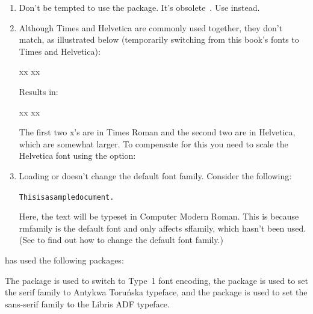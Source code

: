 \begin{enumerate}

\item \warning Don't be tempted to use the  package. It's
obsolete~\cite{l2tabu}. Use  instead.

\item Although Times and Helvetica are commonly used together, they
don't match, as illustrated below (temporarily switching from this
book's fonts to Times and Helvetica):
\begin{codeS}
 xx  xx
\end{codeS}
Results in:
\begin{resultS}[xx xx]
\selectfont xx \selectfont xx
\end{resultS}
The first two x's are in Times Roman and the second two are in
Helvetica, which are somewhat larger. To compensate for this you
need to scale the Helvetica font using the 
option:
\begin{alltt}
\end{alltt}

\item Loading  or  doesn't change the
default font family. Consider the following:
\begin{alltt}


This is a sample document.
\end{alltt}
Here, the text  will be typeset in
Computer Modern Roman. This is because \gls{rmfamily} is the default
font and  only affects \gls{sffamily}, which hasn't
been used. (See  to find out how to change
the default font family.)
\end{enumerate}
 has used the following packages:
\begin{alltt}
\end{alltt}
The  package is used to switch to Type~1 font
encoding,
the  package is used to set the serif family to Antykwa
Toru\'nska typeface, and the  package is used to set
the sans-serif family to the Libris ADF typeface.

